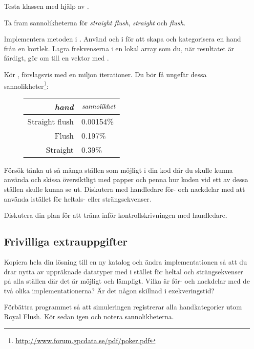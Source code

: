 \Subtask Testa klassen  med hjälp av .


\Task Ta fram sannolikheterna för \emph{straight flush}, \emph{straight} och \emph{flush}.

\Subtask Implementera metoden  i . Använd  och  i  för att skapa och kategorisera en hand från en kortlek. Lagra frekvenserna i en lokal array som du, när resultatet är färdigt, gör om till en vektor med .

\Subtask Kör , förslagsvis med en miljon iterationer. Du bör få ungefär dessa sannolikheter\footnote{\url{http://www.forum.gpcdata.se/pdf/poker.pdf}}:
\begin{figure}[H]\centering
\begin{tabular}{r|l}
\emph{hand} & $\emph{sannolikhet}$ \\ \hline
Straight flush & 0.00154\%  \\
Flush          & 0.197\%    \\
Straight       & 0.39\%     \\
\end{tabular}
\end{figure}

\Task Försök tänka ut så många ställen som möjligt i din kod där du skulle kunna använda  och skissa översiktligt med papper och penna hur koden vid ett av dessa ställen skulle kunna se ut. Diskutera med handledare för- och nackdelar med att använda  istället för heltals- eller strängsekvenser. 

\Task Diskutera din plan för att träna inför kontrollskrivningen med handledare.

\subsection{Frivilliga extrauppgifter}

\Task Kopiera hela din lösning till en ny katalog och ändra implementationen så att du drar nytta av uppräknade datatyper med  i stället för heltal och strängsekvenser på alla ställen där det är möjligt och lämpligt. Vilka är för- och nackdelar med de två olika implementationerna? Är det någon skillnad i exekveringstid?

\Task Förbättra programmet så att simuleringen registrerar alla handkategorier utom Royal Flush. Kör sedan  igen och notera sannolikheterna.

